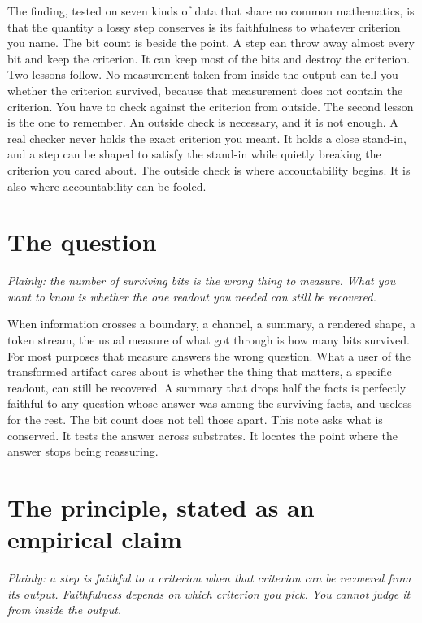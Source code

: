 \documentclass[11pt]{article}
\begin{document}
The finding, tested on seven kinds of data that share no common mathematics, is that the quantity a lossy step conserves is its faithfulness to whatever criterion you name. The bit count is beside the point. A step can throw away almost every bit and keep the criterion. It can keep most of the bits and destroy the criterion. Two lessons follow. No measurement taken from inside the output can tell you whether the criterion survived, because that measurement does not contain the criterion. You have to check against the criterion from outside. The second lesson is the one to remember. An outside check is necessary, and it is not enough. A real checker never holds the exact criterion you meant. It holds a close stand-in, and a step can be shaped to satisfy the stand-in while quietly breaking the criterion you cared about. The outside check is where accountability begins. It is also where accountability can be fooled.

\section{The question}
\emph{Plainly: the number of surviving bits is the wrong thing to measure. What you want to know is whether the one readout you needed can still be recovered.}

When information crosses a boundary, a channel, a summary, a rendered shape, a token stream, the usual measure of what got through is how many bits survived. For most purposes that measure answers the wrong question. What a user of the transformed artifact cares about is whether the thing that matters, a specific readout, can still be recovered. A summary that drops half the facts is perfectly faithful to any question whose answer was among the surviving facts, and useless for the rest. The bit count does not tell those apart. This note asks what is conserved. It tests the answer across substrates. It locates the point where the answer stops being reassuring.

\section{The principle, stated as an empirical claim}
\emph{Plainly: a step is faithful to a criterion when that criterion can be recovered from its output. Faithfulness depends on which criterion you pick. You cannot judge it from inside the output.}
\end{document}
